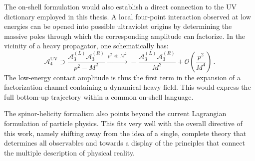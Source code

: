 The on-shell formulation would also establish a direct connection to the UV
dictionary employed in this thesis. A local four-point interaction observed at
low energies can be opened into possible ultraviolet origins by determining
the massive poles through which the corresponding amplitude can factorize. In
the vicinity of a heavy propagator, one schematically has:
\begin{equation}
    \mathcal A_4^{\mathrm{UV}}
    \supset
    \frac{\mathcal A_3^{(L)}\mathcal A_3^{(R)}}{p^2-M^2}
    \xrightarrow{\,p^2\ll M^2\,}
    -\frac{\mathcal A_3^{(L)}\mathcal A_3^{(R)}}{M^2}
    +\mathcal O\!\left(\frac{p^2}{M^4}\right)\,.
    \label{eq:outlook-onshell-factorization}
\end{equation}
The low-energy contact amplitude is thus the first term in the expansion of a
factorization channel containing a dynamical heavy field. This would express
the full bottom-up trajectory within a common on-shell language.

The spinor-helicity formalism also points beyond the current Lagrangian formulation of particle physics. This fits very well with the overall directive of this work, namely shifting away from the idea of a single, complete theory that determines all observables and towards a display of the principles that connect the multiple description of physical reality.